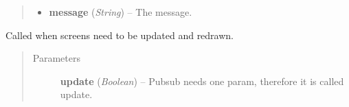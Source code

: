 \documentclass[letterpaper,10pt,english]{sphinxmanual}
\begin{document}
\begin{fulllineitems}
\begin{fulllineitems}
\begin{quote}
\begin{description}
\begin{itemize}
\item {} 
\textbf{message} (\emph{String}) -- The message.

\end{itemize}

\end{description}\end{quote}

\end{fulllineitems}


\begin{fulllineitems}
\label{wos:wos.GUI.UpdateScreens}
Called when screens need to be updated and redrawn.
\begin{quote}\begin{description}
\item[{Parameters}] \leavevmode
\textbf{update} (\emph{Boolean}) -- Pubsub needs one param, therefore it is called update.

\end{description}\end{quote}

\end{fulllineitems}


\end{fulllineitems}

\end{document}
